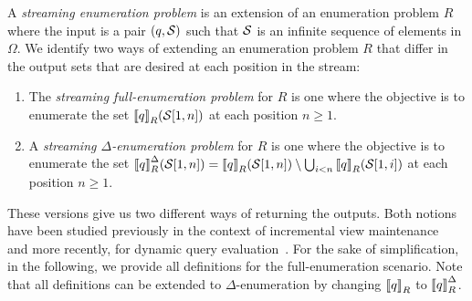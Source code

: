 A \emph{streaming enumeration problem} is an extension of an enumeration problem $R$ where the input is a pair $(q, \mathcal{S})$ such that $\mathcal{S}$ is an infinite sequence of elements in $\Omega$. 
We identify two ways of extending an enumeration problem $R$ that differ in the output sets that are desired at each position in the stream:
\begin{enumerate}
\item The {\em streaming full-enumeration problem} for $R$ is one where the objective is to enumerate the set ${\llbracket{q}\rrbracket}_{R}(\mathcal{S}[1,n])$ at each position $n \geq 1$. 
\item A {\em streaming $\Delta$-enumeration problem} for $R$ is one where the objective is to enumerate the set ${\llbracket{q}\rrbracket}^{\Delta}_{R}(\mathcal{S}[1,n]) = {\llbracket{q}\rrbracket}_{R}(\mathcal{S}[1,n]) \setminus \bigcup_{i < n} {\llbracket{q}\rrbracket}_{R}(\mathcal{S}[1,i])$ at each position $n \geq 1$. 
\end{enumerate}
These versions give us two different ways of returning the outputs. Both notions have been studied previously in the context of incremental view maintenance~\cite{ChirkovaY12} and more recently, for dynamic query evaluation~\cite{IdrisUV17,BerkholzKS17}.
For the sake of simplification, in the following, we provide all definitions for the full-enumeration scenario. Note that all definitions can be extended to $\Delta$-enumeration by changing ${\llbracket{q}\rrbracket}_{R}$ to ${\llbracket{q}\rrbracket}^{\Delta}_R$.



